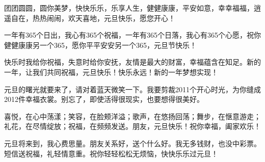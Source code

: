 {团团圆圆，圆你美梦，快快乐乐，乐享人生，健健康康，平安如意，幸幸福福，逍遥自在，热热闹闹，欢天喜地，元旦快乐，愿您开心！

一年有365个日出，我心有365个祝福，一年有365个日落，我心有365个心愿，祝你健健康康另一个365，愿你平平安安另一个365，元旦节快乐！

快乐时我给你祝福，失意时给你安抚，友情是最大的财富，幸福蕴含在知足。新的一年，让我们共同祝福，元旦快乐！快乐永远！新的一年梦想实现！

元旦的曙光就要来了，请对着蓝天微笑一下。我要剪裁2011个开心时光，为你缝成2012件幸福衣裳。别忘了，即使活得很现实，也要想得很美好。

喜悦，在心中荡漾；笑容，在脸颊洋溢；歌声，在悠扬回荡；舞步，在惬意游走；礼花，在尽情绽放；祝福，在频频发送。朋友，元旦快乐！祝你幸福，阖家欢乐！

元旦将来到，我心费思量。朋友关系好，送个什么好。我无多钱财，也没中彩票。短信送祝福，礼轻情意重。祝你轻轻松松无烦恼，快快乐乐过元旦！


}

\makecnabstract